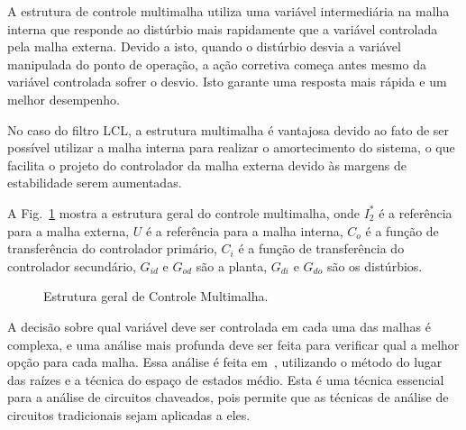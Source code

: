 

  A estrutura de controle multimalha utiliza uma variável intermediária na malha interna que responde ao distúrbio mais rapidamente que a variável controlada pela malha externa. Devido a isto, quando o distúrbio desvia a variável manipulada do ponto de operação, a ação corretiva começa antes mesmo da variável controlada sofrer o desvio. Isto garante uma resposta mais rápida e um melhor desempenho.

  No caso do filtro LCL, a estrutura multimalha é vantajosa devido ao fato de ser possível utilizar a malha interna para realizar o amortecimento do sistema, o que facilita o projeto do controlador da malha externa devido às margens de estabilidade serem aumentadas.

  A Fig.~\ref{fig:multiloop} mostra a estrutura geral do controle multimalha, onde $I_2^*$ é a referência para a malha externa, $U$ é a referência para a malha interna, $C_o$ é a função de transferência do controlador primário, $C_i$ é a função de transferência do controlador secundário, $G_{id}$ e $G_{od}$ são a planta, $G_{di}$ e $G_{do}$ são os distúrbios.


  \begin{figure}[htb]
    \renewcommand\figurename{Fig.}
    \caption{Estrutura geral de Controle Multimalha.}
    \label{fig:multiloop}
  \end{figure}

  A decisão sobre qual variável deve ser controlada em cada uma das malhas é complexa, e uma análise mais profunda deve ser feita para verificar qual a melhor opção para cada malha. Essa análise é feita em~\cite{ref:NASER}, utilizando o método do lugar das raízes e a técnica do espaço de estados médio. Esta é uma técnica essencial para a análise de circuitos chaveados, pois permite que as técnicas de análise de circuitos tradicionais sejam aplicadas a eles.

